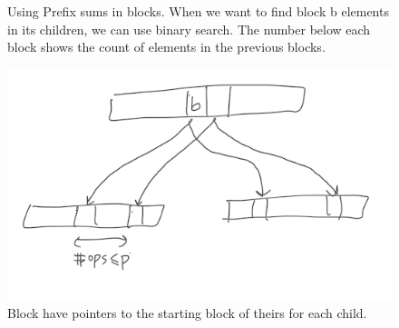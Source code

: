 \documentclass[10pt]{article}
\theoremstyle{definition}
\begin{document}
\begin{figure}
\begin{center}
\end{center}
\caption{\label{fig:prefix} Using Prefix sums in blocks. When we want to find block b elements in its children, we can use binary search. The number below each block shows the count of elements in the previous blocks.}
\end{figure}

\begin{figure}[hbt]
\centering
  \includegraphics[width=5in]{pics/pointers}
  \caption{Block have pointers to the starting block of theirs for each child. \label{fig::pointer}}
\end{figure}
\end{document}
